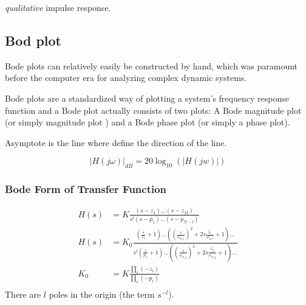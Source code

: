 \documentclass{article}
\begin{document}
\textit{qualitative} impulse response.

\newpage
\subsection{Bod plot}
Bode plots can relatively easily be constructed by hand, which was
paramount before the computer era for analyzing complex dynamic systems. \newline

Bode plots are a standardized way of plotting a system’s frequency response function
and a Bode plot actually consists of two plots: A Bode magnitude plot (or simply
magnitude plot ) and a Bode phase plot (or simply a phase plot). \newline

Asymptote is the line where define the direction of the line.


\begin{equation*}
    |H(j\omega)|_{dB} = 20\log_{10}(|H(jw)|)
\end{equation*}

\subsubsection{Bode Form of Transfer Function}
\begin{align*}
    H(s) &= K \frac{(s-z_1)\ldots(s-z_M)}{s^l(s-p_1)\ldots(s-p_{N-l})} \\
    H(s) &= K_0 \frac{ (\frac{s}{z_1}+1)\ldots((\frac{s}{\omega_{n,i}})^2+2s\frac{\zeta_i}{\omega_{n,i}}+1)\ldots }{ s^l( \frac{s}{p_1}+1) \ldots ((\frac{s}{\omega_{n,j}})^2+2s\frac{\zeta_j}{\omega_{n,j}}+1)\ldots } \\
    K_0 &= K \frac{ \prod_i(-z_i) }{ \prod_i(-p_i) } \\
\end{align*}
There are $l$ poles in the origin (the term $s^{-l}$). 

\newpage
\end{document}
